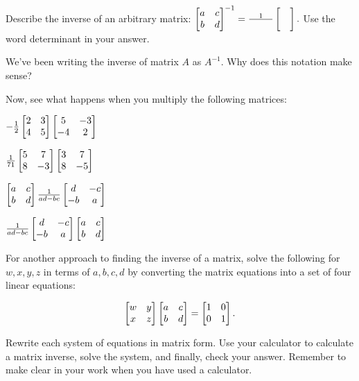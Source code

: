 \documentclass[../gatm_answers.tex]{subfiles}
\begin{document}
\begin{inner_problem}
\item Describe the inverse of an arbitrary matrix: $\begin{bmatrix} a & c \\ b & d \end{bmatrix}^{-1}=\frac{1}{\phantom{000000}}\begin{bmatrix}  &  \\  &  \end{bmatrix}.$ Use the word determinant in your answer.
\end{inner_problem}

\begin{inner_problem}
\item We've been writing the inverse of matrix $A$ as $A^{-1}$. Why does this notation make sense?
\end{inner_problem}

\begin{outer_problem}
\item Now, see what happens when you multiply the following matrices:
\end{outer_problem}

\begin{inner_problem}[start=1]
\item $-\frac{1}{2}\begin{bmatrix} 2 & 3 \\ 4 & 5 \end{bmatrix}\begin{bmatrix} 5 & -3 \\ -4 & 2 \end{bmatrix}$
\end{inner_problem}

\begin{inner_problem}
\item $\frac{1}{71}\begin{bmatrix} 5 & 7 \\ 8 & -3 \end{bmatrix}\begin{bmatrix} 3 & 7 \\ 8 & -5 \end{bmatrix}$
\end{inner_problem}

\begin{inner_problem}
\item $\begin{bmatrix} a & c \\ b & d \end{bmatrix}\frac{1}{ad-bc}\begin{bmatrix} d & -c \\ -b & a \end{bmatrix}$
\end{inner_problem}

\begin{inner_problem}
\item $\frac{1}{ad-bc}\begin{bmatrix} d & -c \\ -b & a \end{bmatrix}\begin{bmatrix} a & c \\ b & d \end{bmatrix}$
\end{inner_problem}

\begin{outer_problem}
\item For another approach to finding the inverse of a matrix, solve the following for $w,x,y,z$ in terms of $a,b,c,d$ by converting the matrix equations into a set of four linear equations:

$$\begin{bmatrix} w & y \\ x & z \end{bmatrix}\begin{bmatrix} a & c \\ b & d \end{bmatrix}=\begin{bmatrix} 1 & 0 \\ 0 & 1 \end{bmatrix}.$$
\end{outer_problem}

\begin{outer_problem}
\item Rewrite each system of equations in matrix form. Use your calculator to calculate a matrix inverse, solve the system, and finally, check your answer. Remember to make clear in your work when you have used a calculator.
\end{outer_problem}
\end{document}
